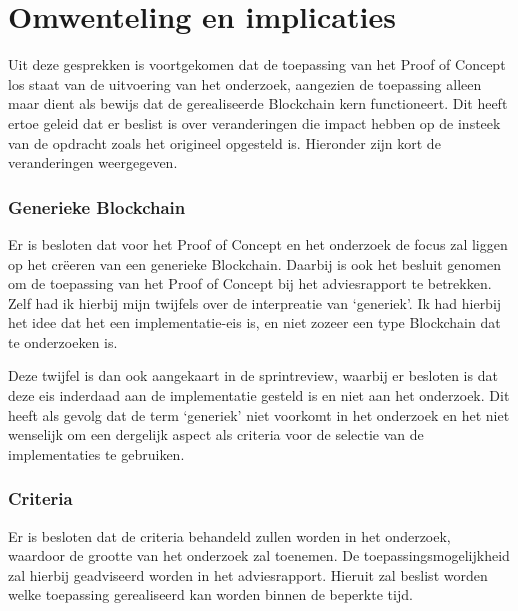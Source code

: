 \section{Omwenteling en implicaties}
\label{chapter:omwenteling}

Uit deze gesprekken is voortgekomen dat de toepassing van het Proof of Concept los staat van de uitvoering van het onderzoek, aangezien de toepassing alleen maar dient als bewijs dat de gerealiseerde Blockchain kern functioneert. Dit heeft ertoe geleid dat er beslist is over veranderingen die impact hebben op de insteek van de opdracht zoals het origineel opgesteld is. Hieronder zijn kort de veranderingen weergegeven.


\subsubsection{Generieke Blockchain} 
Er is besloten dat voor het Proof of Concept en het onderzoek de focus zal liggen op het crëeren van een generieke Blockchain. Daarbij is ook het besluit genomen om de toepassing van het Proof of Concept bij het adviesrapport te betrekken. Zelf had ik hierbij mijn twijfels over de interpreatie van `generiek'. Ik had hierbij het idee dat het een implementatie-eis is, en niet zozeer een type Blockchain dat te onderzoeken is.

\clearpage
Deze twijfel is dan ook aangekaart in de sprintreview, waarbij er besloten is dat deze eis inderdaad aan de implementatie gesteld is en niet aan het onderzoek. Dit heeft als gevolg dat de term `generiek' niet voorkomt in het onderzoek en het niet wenselijk om een dergelijk aspect als criteria voor de selectie van de implementaties te gebruiken.

\subsubsection{Criteria}

Er is besloten dat de criteria behandeld zullen worden in het onderzoek, waardoor de grootte van het onderzoek zal toenemen. De toepassingsmogelijkheid zal hierbij geadviseerd worden in het adviesrapport. Hieruit zal beslist worden welke toepassing gerealiseerd kan worden binnen de beperkte tijd.